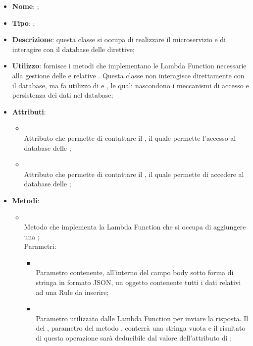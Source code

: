 \begin{itemize}
	\item \textbf{Nome}: ;
	\item \textbf{Tipo}: ;
	\item \textbf{Descrizione}: questa classe si occupa di realizzare il microservizio  e di interagire con il database delle direttive;
	\item \textbf{Utilizzo}: fornisce i metodi che implementano le Lambda Function necessarie alla gestione delle  e relative . Questa classe non interagisce direttamente con il database, ma fa utilizzo di  e , le quali nascondono i meccanismi di accesso e persistenza dei dati nel database;
	\item \textbf{Attributi}:
	\begin{itemize}
		\item[]  \\
		Attributo che permette di contattare il , il quale permette l'accesso al database delle ;
		\item[]  \\
		Attributo che permette di contattare il , il quale permette di accedere al database delle ;
	\end{itemize}
	\item \textbf{Metodi}:
	\begin{itemize}
		\item[]  \\		Metodo che implementa la Lambda Function che si occupa di aggiungere una ;\\
		Parametri:
		\begin{itemize}
			\item {} \\
			Parametro contenente, all'interno del campo body sotto forma di stringa in formato JSON, un oggetto  contenente tutti i dati relativi ad una Rule da inserire;
			\item {} \\
			Parametro utilizzato dalle Lambda Function per inviare la risposta. Il  del , parametro del metodo , conterrà una stringa vuota e il risultato di questa operazione sarà deducibile dal valore dell'attributo di ;

\end{itemize}
\end{itemize}
\end{itemize}
